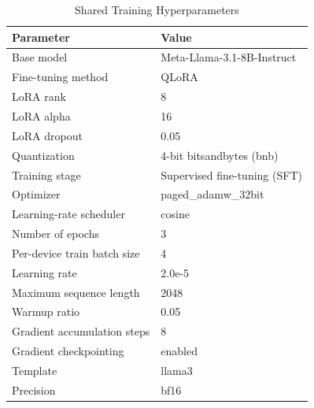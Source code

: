
\begin{table}[htbp]
\centering
\caption{Shared Training Hyperparameters}
\label{tab:shared-training-hyperparameters}
\small
\begin{tabular}{p{5.2cm} p{7.2cm}}
\toprule
Parameter & Value \\
\midrule
Base model & Meta-Llama-3.1-8B-Instruct \\
Fine-tuning method & QLoRA \\
LoRA rank & 8 \\
LoRA alpha & 16 \\
LoRA dropout & 0.05 \\
Quantization & 4-bit bitsandbytes (bnb) \\
Training stage & Supervised fine-tuning (SFT) \\
Optimizer & paged\_adamw\_32bit \\
Learning-rate scheduler & cosine \\
Number of epochs & 3 \\
Per-device train batch size & 4 \\
Learning rate & 2.0e-5 \\
Maximum sequence length & 2048 \\
Warmup ratio & 0.05 \\
Gradient accumulation steps & 8 \\
Gradient checkpointing & enabled \\
Template & llama3 \\
Precision & bf16 \\
\bottomrule
\end{tabular}
\end{table}
